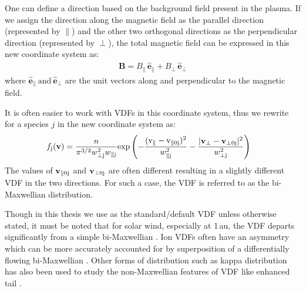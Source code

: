             One can define a direction based on the background field present in the plasma. If we
            assign the direction along the magnetic field as the parallel direction (represented by
            $\parallel$) and the other two orthogonal directions as the perpendicular direction
            (represented by $\perp$), the total magnetic field can be expressed in this new
            coordinate system as:
            \begin{align}
                \mathbf{B} = B_\parallel\,\mathbf{\hat{e}}_\parallel + B_\perp\,\mathbf{\hat{e}}_\perp \label{eq:newdir}
            \end{align}
            where $\mathbf{\hat{e}}_\parallel~\mathrm{and}~\mathbf{\hat{e}}_\perp$ are the unit
            vectors along and perpendicular to the magnetic field.

            It is often easier to work with VDFs in this coordinate system, thus we rewrite
             for a species $j$ in the new coordinate system as:
            \begin{align}
                \mathnormal{f}_{\rm j}(\mathbf{v}) & = \frac{n}{\pi^{3/2} w_{\rm \perp j}^2 w_{\rm \parallel j}} \mathrm{exp}\left(-\frac{(\mathrm{v}_\parallel - \mathrm{v}_{\rm \parallel 0j})^2}{w_{\rm \parallel j}^2} -\frac{|\mathbf{v}_\perp - \mathbf{v}_{\rm \perp 0j}|^2}{w_{\rm \perp j}^2}\right) \label{eq:vdf2}
            \end{align}
            The values of $\mathbf{v}_{\rm \parallel 0j}$ and $\mathbf{v}_{\rm \perp 0j}$ are often
            different resulting in a slightly different VDF in the two directions. For such a case,
            the VDF is referred to as the bi-Maxwellian distribution.
            
            Though in this thesis we use  as the standard/default VDF unless otherwise
            stated, it must be noted that for solar wind, especially at 1\,au, the VDF departs
            significantly from a simple bi-Maxwellian \citep{Feldman1974, Feldman1974a, Marsch1982b,
            Alterman2018}. Ion VDFs often have an asymmetry which can be more accurately accounted
            for by superposition of a differentially flowing bi-Maxwellian \citep{Alterman2018}.
            Other forms of distribution such as kappa distribution has also been used to study the
            non-Maxwellian features of VDF like enhanced tail \citep{Pierrard2010,Pierrard2014,
            Maksimovic1997,Nicolaou2020}.


